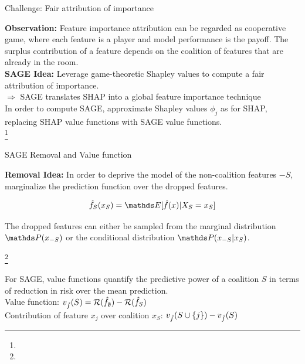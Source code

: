 \documentclass[11pt,compress,t,notes=noshow, xcolor=table]{beamer}
\begin{document}
\begin{vbframe}{Challenge: Fair attribution of importance}

\textbf{Observation:} Feature importance attribution can be regarded as cooperative game, where each feature is a player and model performance is the payoff. The surplus contribution of a feature depends on the coalition of features that are already in the room.\\
\lz
\textbf{SAGE Idea:} Leverage game-theoretic Shapley values to compute a fair attribution of importance.\\
\lz
$\Rightarrow$ SAGE translates SHAP into a global feature importance technique\\
\lz
In order to compute SAGE, approximate Shapley values $\phi_j$ as for SHAP, replacing SHAP value functions with SAGE value functions.\\

\footnote[frame]{}
  
\end{vbframe}


\begin{vbframe}{SAGE Removal and Value function}
  
 \textbf{Removal Idea:} In order to deprive the model of the non-coalition features $-S$, marginalize the prediction function over the dropped features.

$$\fh_S(x_S) = \E[\fh(x) | X_S = x_S]$$
  
The dropped features can either be sampled from the marginal distribution $\P(x_{-S})$ or the conditional distribution $\P(x_{-S}|x_S)$.\\
\lz

\footnote[frame]{}

For SAGE, value functions quantify the predictive power of a coalition $S$ in terms of reduction in risk over the mean prediction.\\
\lz
Value function:  $ v_{\fh}(S) = \risk(\fh_{\emptyset}) - \risk(\fh_{S})$\\
\lz
Contribution of feature $x_j$ over coalition $x_S$:  $v_{\fh}(S \cup \{j\}) - v_{\fh}(S)$\\
\lz

\end{vbframe}
\end{document}

